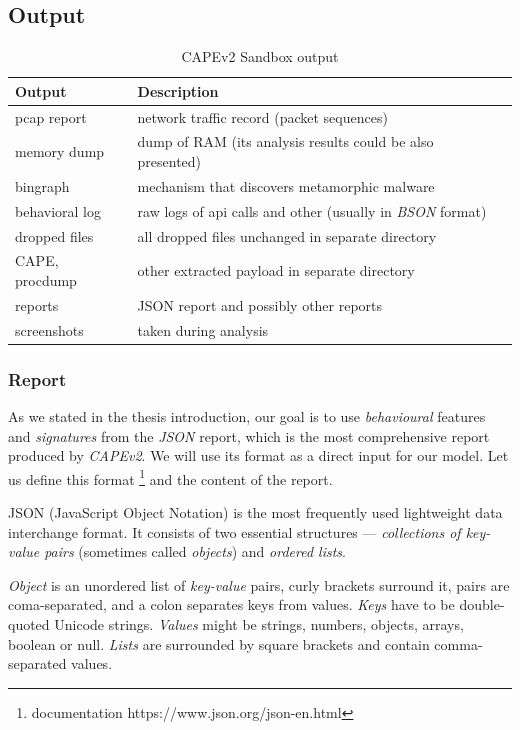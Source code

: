 \subsection*{Output}
\begin{table}[h]
  \centering
  \caption{CAPEv2 Sandbox output}
  \begin{tabular}{p{2cm}p{6cm}p{6cm}} 
      \toprule
      \textbf{Output} &
      \textbf{Description} \\
      \midrule
      pcap report & network traffic record (packet sequences) \\
      \midrule
      memory dump & dump of RAM (its analysis results could be also presented) \\
      \midrule
      bingraph & mechanism that discovers metamorphic malware \cite{Kwon2012}\\
      \midrule
      behavioral log & raw logs of api calls and other (usually in \emph{BSON} format) \\
      \midrule
      dropped files & all dropped files unchanged in separate directory \\
      \midrule
      CAPE, procdump & other extracted payload in separate directory \\
      \midrule
      reports & JSON report and possibly other reports  \\
      \midrule
      screenshots & taken during analysis  \\
      \bottomrule
  \end{tabular}
  \label{tab:sandbox-out}
\end{table}

\subsubsection{Report}
As we stated in the thesis introduction, our goal is to use \emph{behavioural} features and \emph{signatures} from the \emph{JSON} report, which is the most comprehensive report produced by \emph{CAPEv2}. We will use its format as a direct input for our model. Let us define this format \footnote{documentation https://www.json.org/json-en.html} and the content of the report.

JSON (JavaScript Object Notation) is the most frequently used lightweight data interchange format. It consists of two essential structures ---  \emph{collections of key-value pairs} (sometimes called \emph{objects}) and \emph{ordered lists}. 

\emph{Object} is an unordered list of \emph{key-value} pairs, curly brackets surround it, pairs are coma-separated, and a colon separates keys from values. \emph{Keys} have to be double-quoted Unicode strings. \emph{Values} might be strings, numbers, objects, arrays, boolean or null. \emph{Lists} are surrounded by square brackets and contain comma-separated values.

